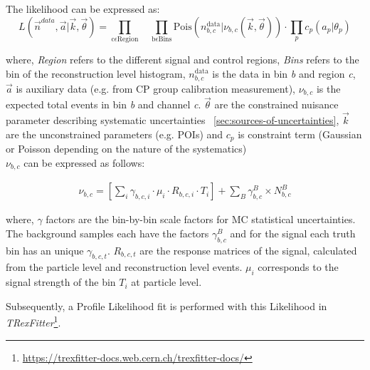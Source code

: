 The likelihood can be expressed as:
\begin{equation}\label{eq:likelihodd-defn}
	L(\vec{n}^{data},\vec{a} | \vec{k}, \vec{\theta}) = \prod_{\mathrm{c} \epsilon \mathrm{Region}} \quad \prod_{\mathrm{b} \epsilon \mathrm{Bins}} \mathrm{Pois} (n^{\mathrm{data}}_{b,c}|\nu_{b,c}(\vec{k}, \Vec{\theta})) \cdot \prod_{p} c_p(a_p|\theta_{p})
\end{equation}

where, \textit{Region} refers to the different signal and control regions, \textit{Bins} refers to the bin of the reconstruction level 
histogram, $n^{\mathrm{data}}_{b,c}$ is the data in bin \textit{b} and  region \textit{c}, $\vec{a}$ is auxiliary data (e.g. from CP group calibration measurement), $\nu_{b,c}$ is the expected total events in bin \textit{b} and channel \textit{c}. $\Vec{\theta}$ are the constrained nuisance parameter describing systematic uncertainties ~\cref{sec:sources-of-uncertainties}, $\vec{k}$ are the unconstrained parameters (e.g. POIs) and $c_p$ is constraint term (Gaussian or Poisson depending on the nature of the systematics)\\

$\nu_{b,c}$ can be expressed as follows:

\begin{align}\label{eq:likelihodd-defn-1}
    \nu_{b,c} = \left[\sum_i \gamma_{b,c,i} \cdot \mu_{i} \cdot R_{b,c,i} \cdot T_{i}\right] + \sum_{B} \gamma_{b,c}^{B} \times N_{b,c}^{B} 
\end{align}

where, $\gamma$ factors are the bin-by-bin scale factors for MC statistical uncertainties. The background samples each have the factors $\gamma_{b,c}^{B}$ and for the signal each truth bin has an unique $\gamma_{b,c,t}$. $R_{b,c,t}$ are the response matrices of the signal, calculated from the particle level and reconstruction level events. $\mu_{i}$ corresponds to the signal strength of the bin $T_{i}$ at particle level.

Subsequently, a Profile Likelihood fit is performed with this Likelihood in \emph{TRexFitter}\footnote{\url{https://trexfitter-docs.web.cern.ch/trexfitter-docs/}}.


